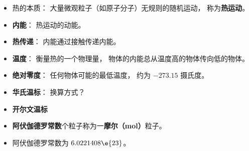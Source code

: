 
\begin{issues}
\issueDraft
\end{issues}

\begin{itemize}
\item 热的本质： 大量微观粒子（如原子分子）无规则的随机运动， 称为\textbf{热运动}。
\item \textbf{内能}： 热运动的动能。
\item \textbf{热传递}： 内能通过接触传递内能。
\item \textbf{温度}： 衡量热的一个物理量， 物体的内能总从温度高的物体传向低的物体。
\item \textbf{绝对零度}： 任何物体可能的最低温度， 约为 $-273.15$ 摄氏度。
\item \textbf{华氏温标}： 换算方式？
\item \textbf{开尔文温标}
\item \textbf{阿伏伽德罗常数}个粒子称为一\textbf{摩尔（mol）}粒子。
\item 阿伏伽德罗常数为 $6.0221408\e{23}$。
\end{itemize}
